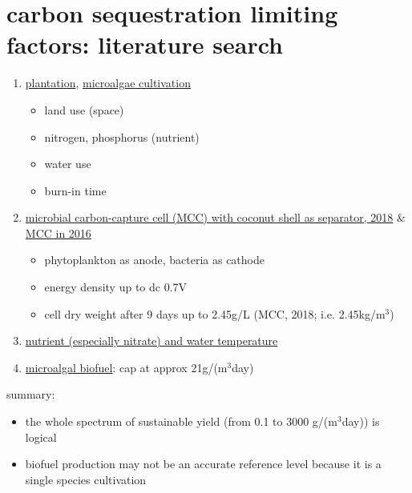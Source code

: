 \documentclass[../thesis.tex]{subfiles} %
\begin{document}
\section{carbon sequestration limiting factors: literature search}
\begin{enumerate}
    \item \href{https://doi.org/10.1007/s10584-012-0682-3}{plantation}, \href{https://doi.org/10.1007/s11120-011-9638-0}{microalgae cultivation} %
    \begin{itemize}
        \item land use (space)
        \item nitrogen, phosphorus (nutrient)
        \item water use
        \item burn-in time
    \end{itemize}
    \item \href{https://doi.org/10.1016/j.bej.2018.02.014}{microbial carbon-capture cell (MCC) with coconut shell as separator, 2018} \& \href{https://doi.org/10.1016/j.biortech.2011.12.067}{MCC in 2016} %
    \begin{itemize}
        \item phytoplankton as anode, bacteria as cathode
        \item energy density up to dc 0.7V
        \item cell dry weight after 9 days up to 2.45g/L (MCC, 2018; i.e. 2.45kg/m$^3$)
    \end{itemize}
    \item \href{http://dx.doi.org/10.3923/jfas.2011.130.140}{nutrient (especially nitrate) and water temperature} %
    \item \href{https://doi.org/10.1007/s10811-017-1214-3}{microalgal biofuel}: cap at approx 21g/(m$^3$day) %
\end{enumerate}
summary:
\begin{itemize}
    \item the whole spectrum of sustainable yield (from 0.1 to 3000 g/(m$^3$day)) is logical
    \item biofuel production may not be an accurate reference level because it is a single species cultivation
\end{itemize}
\end{document}
